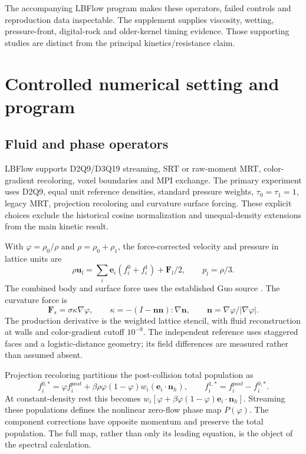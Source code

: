 \documentclass[preprint,12pt]{elsarticle}
\begin{document}
The accompanying LBFlow program makes these operators, failed controls and
reproduction data inspectable.
The supplement supplies viscosity, wetting, pressure-front,
digital-rock and older-kernel timing evidence. Those supporting studies
are distinct from the principal kinetics/resistance claim.

\section{Controlled numerical setting and program}
\subsection{Fluid and phase operators}
LBFlow supports D2Q9/D3Q19 streaming, SRT or raw-moment MRT, color-gradient
recoloring, voxel boundaries and MPI exchange. The primary experiment uses
D2Q9, equal unit reference densities, standard pressure weights,
$\tau_0=\tau_1=1$, legacy MRT, projection recoloring and curvature surface
forcing. These explicit choices exclude the historical cosine normalization
and unequal-density extensions from the main kinetic result.

With $\varphi=\rho_0/\rho$ and $\rho=\rho_0+\rho_1$, the force-corrected
velocity and pressure in lattice units are
\begin{equation}
 \rho\bm u_l=\sum_i\bm e_i(f_i^0+f_i^1)+\bm F_l/2,\qquad p_l=\rho/3.
\end{equation}
The combined body and surface force uses the established Guo source
\cite{guo2002}. The curvature force is
\begin{equation}
 \bm F_s=\sigma\kappa\nabla\varphi,\qquad
 \kappa=-(I-\bm n\bm n):\nabla\bm n,\qquad
 \bm n=\nabla\varphi/|\nabla\varphi|.
\end{equation}
The production derivative is the weighted lattice stencil, with fluid
reconstruction at walls and color-gradient cutoff $10^{-9}$.
The independent reference uses staggered faces and a logistic-distance
geometry; its field differences are measured rather than assumed absent.

Projection recoloring partitions the post-collision total population as
\begin{equation}
 f_i^{0,*}=\varphi f_i^{post}
 +\beta\rho\varphi(1-\varphi)w_i(\bm e_i\cdot\bm n_h),
 \qquad f_i^{1,*}=f_i^{post}-f_i^{0,*}.
\end{equation}
At constant-density rest this becomes
$w_i[\varphi+\beta\varphi(1-\varphi)\bm e_i\cdot\bm n_h]$.
Streaming these populations defines the nonlinear zero-flow phase map
$P(\varphi)$. The component corrections have opposite momentum and preserve
the total population. The full map, rather than only its leading equation,
is the object of the spectral calculation.
\end{document}
